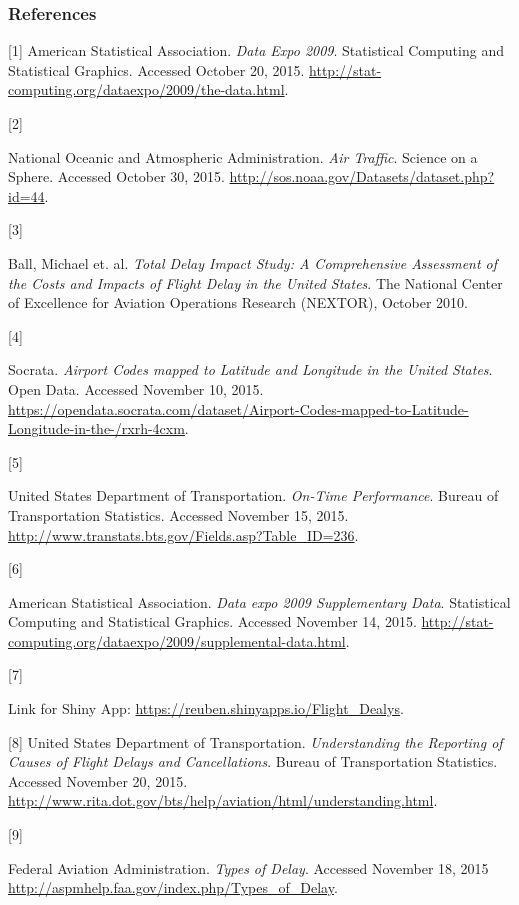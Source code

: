 \documentclass{article} %
\begin{document}
\clearpage
\newpage


\subsubsection*{References}


\hypertarget{Ref1}{[1] American Statistical Association. \textit{Data Expo 2009}. Statistical Computing and Statistical Graphics. Accessed October 20, 2015. \url{http://stat-computing.org/dataexpo/2009/the-data.html}.}

\hypertarget{Ref2}{[2]} National Oceanic and Atmospheric Administration. \textit{Air Traffic}. Science on a Sphere. Accessed October 30, 2015. \url{http://sos.noaa.gov/Datasets/dataset.php?id=44}.

\hypertarget{Ref3}{[3]} Ball, Michael et. al. \textit{Total Delay Impact Study: A Comprehensive Assessment of the Costs and Impacts of Flight Delay in the United States}. The National Center of Excellence for Aviation Operations Research (NEXTOR), October 2010.

\hypertarget{Ref4}{[4]} Socrata. \textit{Airport Codes mapped to Latitude and Longitude in the United States}. Open Data. Accessed November 10, 2015. \url{https://opendata.socrata.com/dataset/Airport-Codes-mapped-to-Latitude-Longitude-in-the-/rxrh-4cxm}.

\hypertarget{Ref5}{[5]}United States Department of Transportation. \textit{On-Time Performance}. Bureau of Transportation Statistics. Accessed November 15, 2015. \url{http://www.transtats.bts.gov/Fields.asp?Table_ID=236}.

\hypertarget{Ref6}{[6]}American Statistical Association. \textit{Data expo 2009 Supplementary Data}. Statistical Computing and Statistical Graphics. Accessed November 14, 2015. \url{http://stat-computing.org/dataexpo/2009/supplemental-data.html}.

\hypertarget{Ref7}{[7]} Link for Shiny App: \url{https://reuben.shinyapps.io/Flight_Dealys}.

[8] United States Department of Transportation. \textit{Understanding the Reporting of Causes of Flight Delays and Cancellations}. Bureau of Transportation Statistics. Accessed November 20, 2015. \url{http://www.rita.dot.gov/bts/help/aviation/html/understanding.html}.

\hypertarget{Ref9}{[9]} Federal Aviation Administration. \textit{Types of Delay}. Accessed November 18, 2015 \url{http://aspmhelp.faa.gov/index.php/Types_of_Delay}.

\clearpage
\newpage
\end{document}
